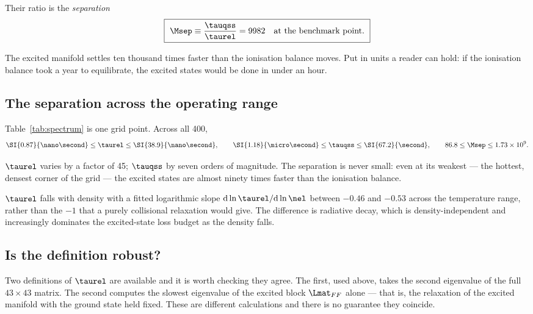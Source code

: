 Their ratio is the \emph{separation}
\begin{equation}
  \boxed{\ \Msep \equiv \frac{\tauqss}{\taurel} = 9982
  \quad\text{at the benchmark point.}\ }
  \label{eq:M_benchmark}
\end{equation}

The excited manifold settles ten thousand times faster than the ionisation
balance moves. Put in units a reader can hold: if the ionisation balance took a
year to equilibrate, the excited states would be done in under an hour.

\subsection{The separation across the operating range}

Table~\ref{tab:spectrum} is one grid point. Across all 400,
\begin{equation}
  \SI{0.87}{\nano\second} \le \taurel \le \SI{38.9}{\nano\second},
  \qquad
  \SI{1.18}{\micro\second} \le \tauqss \le \SI{67.2}{\second},
  \qquad
  86.8 \le \Msep \le 1.73\times10^{9}.
  \label{eq:M_range}
\end{equation}

\noindent $\taurel$ varies by a factor of 45; $\tauqss$ by seven orders of
magnitude. The separation is never small: even at its weakest --- the hottest,
densest corner of the grid --- the excited states are almost ninety times faster
than the ionisation balance.

$\taurel$ falls with density with a fitted logarithmic slope
$\mathrm{d}\ln\taurel/\mathrm{d}\ln\nel$ between $-0.46$ and $-0.53$ across the
temperature range, rather than the $-1$ that a purely collisional relaxation
would give. The difference is radiative decay,
which is density-independent and increasingly dominates the excited-state loss
budget as the density falls.

\subsection{Is the definition robust?}

Two definitions of $\taurel$ are available and it is worth checking they agree.
The first, used above, takes the second eigenvalue of the full $43\times43$
matrix. The second computes the slowest eigenvalue of the excited block
$\Lmat_{FF}$ alone --- that is, the relaxation of the excited manifold with the
ground state held fixed. These are different calculations and there is no
guarantee they coincide.

